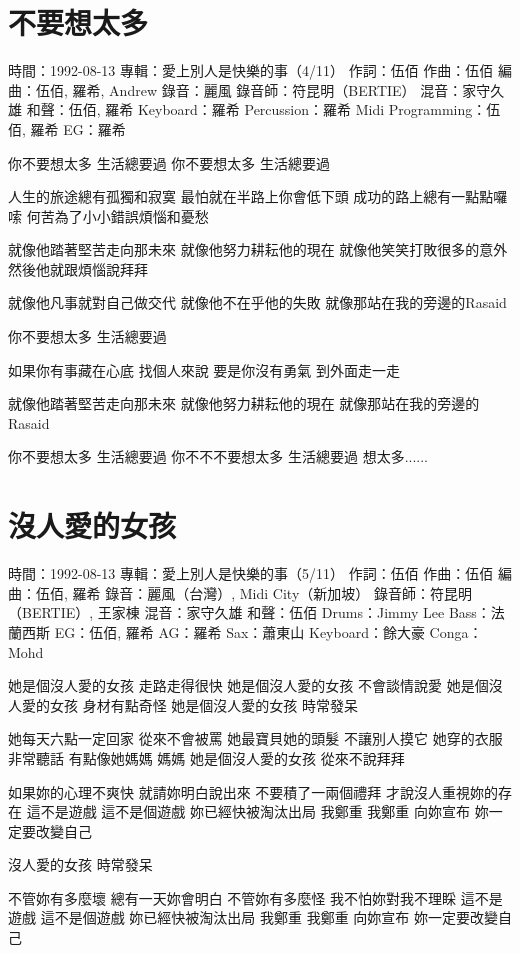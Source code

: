 \documentclass[UTF8,a4paper,oneside,twocolumn,12pt]{ctexbook}
\newcommand{\infopair}[2]{\textbullet #1：#2}
\newcommand{\zc}[1][伍佰]{\infopair{作詞}{#1}}
\newcommand{\zq}[1][伍佰]{\infopair{作曲}{#1}}
\newcommand{\bq}[1][伍佰]{\infopair{編曲}{#1}}
\newcommand{\zj}[1]{\infopair{專輯}{#1}}
\newcommand{\sj}[1]{\infopair{時間}{#1}}
\newenvironment{info}{\begin{flushleft}\kaishu
	}
	{\end{flushleft}\normalsize\yahei\par}
\newenvironment{lyric}{
	}
{}
\begin{document}
\section{不要想太多}
\begin{info}
	\sj{1992-08-13}
	\zj{愛上別人是快樂的事（4/11）}
	\zc
	\zq
	\bq[伍佰, 羅希, Andrew]
	\infopair{錄音}{麗風}
	\infopair{錄音師}{符昆明（BERTIE）}
	\infopair{混音}{家守久雄}
	\infopair{和聲}{伍佰, 羅希}
	\infopair{Keyboard}{羅希}
	\infopair{Percussion}{羅希}
	\infopair{Midi Programming}{伍佰, 羅希}
	\infopair{EG}{羅希}
\end{info}
\begin{lyric}
	你不要想太多  生活總要過
	你不要想太多  生活總要過

	人生的旅途總有孤獨和寂寞
	最怕就在半路上你會低下頭
	成功的路上總有一點點囉嗦
	何苦為了小小錯誤煩惱和憂愁

	就像他踏著堅苦走向那未來
	就像他努力耕耘他的現在
	就像他笑笑打敗很多的意外
	然後他就跟煩惱說拜拜

	就像他凡事就對自己做交代
	就像他不在乎他的失敗
	就像那站在我的旁邊的Rasaid

	你不要想太多  生活總要過

	如果你有事藏在心底  找個人來說
	要是你沒有勇氣  到外面走一走

	就像他踏著堅苦走向那未來
	就像他努力耕耘他的現在
	就像那站在我的旁邊的Rasaid

	你不要想太多  生活總要過
	你不不不要想太多  生活總要過
	想太多......
\end{lyric}

\section{沒人愛的女孩}
\begin{info}
	\sj{1992-08-13}
	\zj{愛上別人是快樂的事（5/11）}
	\zc
	\zq
	\bq[伍佰, 羅希]
	\infopair{錄音}{麗風（台灣）, Midi City（新加坡）}
	\infopair{錄音師}{符昆明（BERTIE）, 王家棟}
	\infopair{混音}{家守久雄}
	\infopair{和聲}{伍佰}
	\infopair{Drums}{Jimmy Lee}
	\infopair{Bass}{法蘭西斯}
	\infopair{EG}{伍佰, 羅希}
	\infopair{AG}{羅希}
	\infopair{Sax}{蕭東山}
	\infopair{Keyboard}{餘大豪}
	\infopair{Conga}{Mohd}
\end{info}
\begin{lyric}
	她是個沒人愛的女孩 走路走得很快
	她是個沒人愛的女孩 不會談情說愛
	她是個沒人愛的女孩 身材有點奇怪
	她是個沒人愛的女孩 時常發呆

	她每天六點一定回家 從來不會被罵
	她最寶貝她的頭髮   不讓別人摸它
	她穿的衣服非常聽話 有點像她媽媽  媽媽
	她是個沒人愛的女孩 從來不說拜拜

	如果妳的心理不爽快 就請妳明白說出來
	不要積了一兩個禮拜 才說沒人重視妳的存在
	這不是遊戲  這不是個遊戲  妳已經快被淘汰出局
	我鄭重  我鄭重  向妳宣布  妳一定要改變自己

	沒人愛的女孩  時常發呆

	不管妳有多麼壞  總有一天妳會明白
	不管妳有多麼怪  我不怕妳對我不理睬
	這不是遊戲  這不是個遊戲  妳已經快被淘汰出局
	我鄭重  我鄭重  向妳宣布  妳一定要改變自己
\end{lyric}
\end{document}
